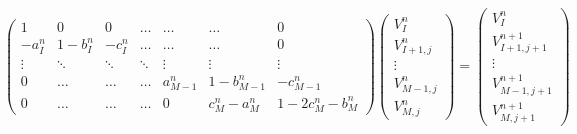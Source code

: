 \documentclass{ctexart} %
\begin{document}
\begin{equation}
\label{meq2}
\left(
\begin{matrix}
1          & 0       & 0       &\ldots  & \ldots &\ldots     & 0 \\
-a^n_I       & 1-b^n_I   & -c^n_I    &\ldots  & \ldots &\ldots     & 0       \\
\vdots     & \ddots  & \ddots  &\ddots  & \vdots & \vdots    & \vdots   \\
0          & \ldots  & \ldots  &\ldots  & a^n_{M-1} & 1-b^n_{M-1} & -c^n_{M-1}   \\
0          & \ldots  & \ldots  &\ldots  &0        & c^n_M-a^n_M   & 1-2c^n_M-b^n_M      
\end{matrix}
\right)
\left(
\begin{matrix}
V_I^n\\
V_{I+1,j}^{n}\\
\vdots\\
V_{M-1,j}^{n}\\
V_{M,j}^{n}
\end{matrix}
\right)
=
\left(
\begin{matrix}
V_I^n\\
V_{I+1,j+1}^{n+1}\\
\vdots\\
V_{M-1,j+1}^{n+1}\\
V_{M,j+1}^{n+1}
\end{matrix}
\right)
\end{equation}
\end{document}
